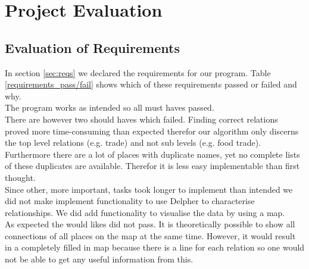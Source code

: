 \chapter{Project Evaluation}


\section{Evaluation of Requirements}
In section \ref{sec:reqs} we declared the requirements for our program. Table \ref{requirements_pass/fail} shows which of these requirements passed or failed and why. \\

The program works as intended so all must haves passed. \\
There are however two should haves which failed. Finding correct relations proved more time-consuming than expected therefor our algorithm only discerns the top level relations (e.g. trade) and not sub levels (e.g. food trade). Furthermore there are a lot of places with duplicate names, yet no complete lists of these duplicates are available. Therefor it is less easy implementable than first thought. \\
Since other, more important, tasks took longer to implement than intended we did not make implement functionality to use Delpher to characterise relationships. We did add functionality to visualise the data by using a map. \\
As expected the would likes did not pass. It is theoretically possible to show all connections of all places on the map at the same time. However, it would result in a completely filled in map because there is a line for each relation so one would not be able to get any useful information from this.

